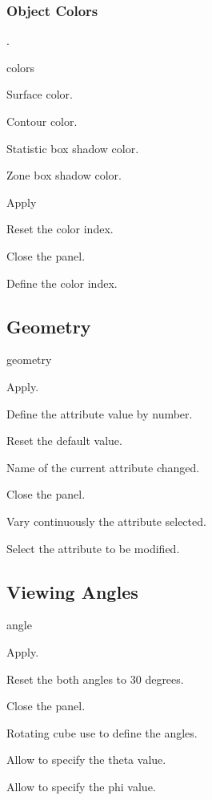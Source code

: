 \subsubsection{Object Colors}.

\begin{PAWf}[.65]{colors}
\begin{EnumZW}
\item Surface color.
\item Contour color.
\item Statistic box shadow color.
\item Zone box shadow color.
\end{EnumZW}
\begin{EnumZB}
\item Apply
\item Reset the color index.
\item Close the panel.
\item Define the color index.
\end{EnumZB}
\end{PAWf}

\newpage

\subsection{Geometry}

\begin{PAWf}[.5]{geometry}
\begin{EnumZB}
\item Apply.
\item Define the attribute value by number.
\item Reset the default value.
\item Name of the current attribute changed.
\item Close the panel.
\item Vary continuously the attribute selected.
\item Select the attribute to be modified.
\end{EnumZB}
\end{PAWf}

\subsection{Viewing Angles}

\begin{PAWf}[.6]{angle}
\begin{EnumZW}
\item Apply.
\item Reset the both angles to 30 degrees.
\item Close the panel.
\end{EnumZW}
\begin{EnumZB}
\item Rotating cube use to define the angles.
\item Allow to specify the theta value.
\item Allow to specify the phi value.
\end{EnumZB}
\end{PAWf}

